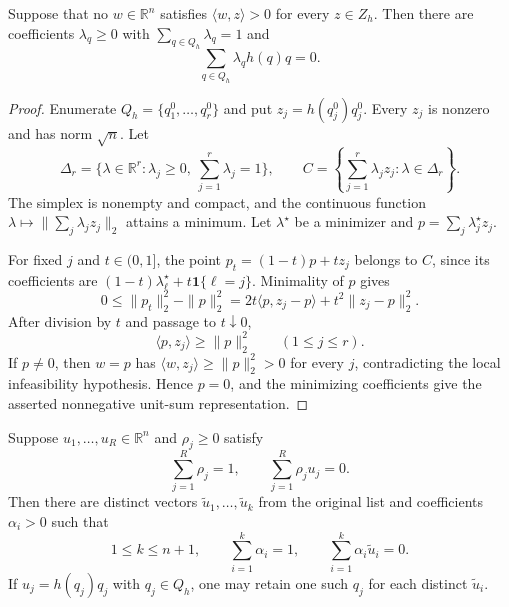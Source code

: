 \begin{proposition}
\label{prop:step-005-closest-point}
Suppose that no $w\in\mathbb R^n$ satisfies
$\langle w,z\rangle>0$ for every $z\in Z_h$.  Then there are coefficients
$\lambda_q\geq0$ with $\sum_{q\in Q_h}\lambda_q=1$ and
\[
\sum_{q\in Q_h}\lambda_q h(q)q=0.
\]
\end{proposition}

\begin{proof}
Enumerate $Q_h=\{q_1^0,\ldots,q_r^0\}$ and put
$z_j=h(q_j^0)q_j^0$.  Every $z_j$ is nonzero and has norm $\sqrt n$.  Let
\[
 \Delta_r=\{\lambda\in\mathbb R^r:\lambda_j\geq0,
 \ \sum_{j=1}^r\lambda_j=1\},
 \qquad
 C=\left\{\sum_{j=1}^r\lambda_jz_j:\lambda\in\Delta_r\right\}.
\]
The simplex is nonempty and compact, and the continuous function
$\lambda\mapsto\|\sum_j\lambda_jz_j\|_2$ attains a minimum.  Let
$\lambda^\star$ be a minimizer and
$p=\sum_j\lambda_j^\star z_j$.

For fixed $j$ and $t\in(0,1]$, the point
$p_t=(1-t)p+t z_j$ belongs to $C$, since its coefficients are
$(1-t)\lambda_\ell^\star+t\mathbf 1\{\ell=j\}$.  Minimality of $p$ gives
\[
0\leq\|p_t\|_2^2-\|p\|_2^2
=2t\langle p,z_j-p\rangle+t^2\|z_j-p\|_2^2.
\]
After division by $t$ and passage to $t\downarrow0$,
\[
\langle p,z_j\rangle\geq\|p\|_2^2
\qquad(1\leq j\leq r).
\]
If $p\neq0$, then $w=p$ has
$\langle w,z_j\rangle\geq\|p\|_2^2>0$ for every $j$, contradicting the
local infeasibility hypothesis.  Hence $p=0$, and the minimizing coefficients
give the asserted nonnegative unit-sum representation.
\end{proof}

\begin{lemma}
\label{lem:step-005-support-pruning}
Suppose $u_1,\ldots,u_R\in\mathbb R^n$ and $\rho_j\geq0$ satisfy
\[
\sum_{j=1}^R\rho_j=1,
\qquad
\sum_{j=1}^R\rho_j u_j=0.
\]
Then there are distinct vectors $\widetilde u_1,\ldots,\widetilde u_k$
from the original list and coefficients $\alpha_i>0$ such that
\[
1\leq k\leq n+1,
\qquad \sum_{i=1}^k\alpha_i=1,
\qquad \sum_{i=1}^k\alpha_i\widetilde u_i=0.
\]
If $u_j=h(q_j)q_j$ with $q_j\in Q_h$, one may retain one such $q_j$ for
each distinct $\widetilde u_i$.
\end{lemma}

